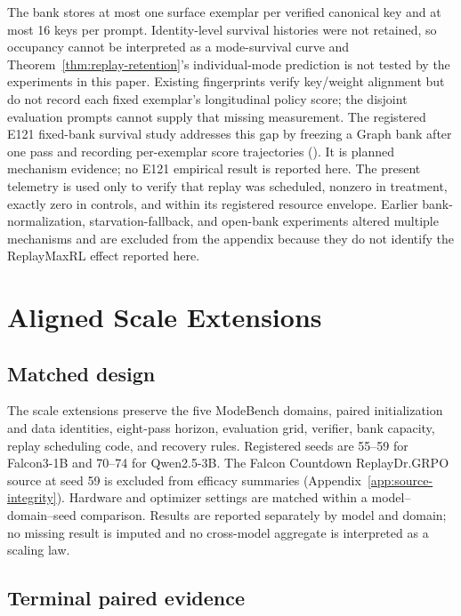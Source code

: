 The bank stores at most one surface exemplar per verified canonical key and at
most 16 keys per prompt. Identity-level survival histories were not retained,
so occupancy cannot be interpreted as a mode-survival curve and
Theorem~\ref{thm:replay-retention}'s individual-mode prediction is not tested by
the experiments in this paper. Existing fingerprints verify key/weight
alignment but do not record each fixed exemplar's longitudinal policy score;
the disjoint evaluation prompts cannot supply that missing measurement. The
registered E121 fixed-bank survival study addresses this gap by freezing a
Graph bank after one pass and recording per-exemplar score trajectories
().
It is planned mechanism evidence; no E121 empirical result is reported here.
The present telemetry is used only to verify that
replay was scheduled, nonzero in treatment, exactly zero in controls, and
within its registered resource envelope. Earlier
bank-normalization, starvation-fallback, and open-bank experiments altered
multiple mechanisms and are excluded from the appendix because they do not
identify the ReplayMaxRL effect reported here.

\section{Aligned Scale Extensions}
\label{app:aligned-xmode}

\subsection{Matched design}
\label{app:scale-matrix}

The scale extensions preserve the five ModeBench domains, paired initialization
and data identities, eight-pass horizon, evaluation grid, verifier, bank
capacity, replay scheduling code, and recovery rules. Registered seeds are
55--59 for Falcon3-1B and 70--74 for Qwen2.5-3B. The Falcon Countdown
ReplayDr.GRPO source at seed 59 is excluded from efficacy summaries
(Appendix~\ref{app:source-integrity}). Hardware and optimizer settings are matched
within a model--domain--seed comparison. Results are reported separately by
model and domain; no missing result is imputed and no cross-model aggregate
is interpreted as a scaling law.

\subsection{Terminal paired evidence}
\label{app:scale-snapshot}

